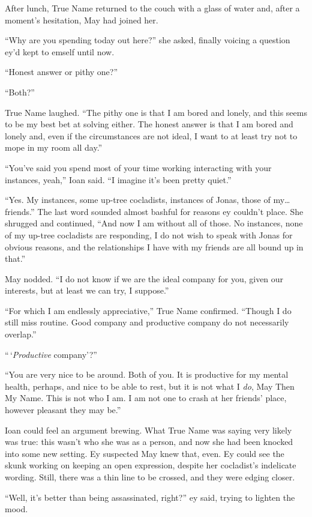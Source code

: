 After lunch, True Name returned to the couch with a glass of water and, after a moment's hesitation, May had joined her.

``Why are you spending today out here?'' she asked, finally voicing a question ey'd kept to emself until now.

``Honest answer or pithy one?''

``Both?''

True Name laughed. ``The pithy one is that I am bored and lonely, and this seems to be my best bet at solving either. The honest answer is that I am bored and lonely and, even if the circumstances are not ideal, I want to at least try not to mope in my room all day.''

``You've said you spend most of your time working interacting with your instances, yeah,'' Ioan said. ``I imagine it's been pretty quiet.''

``Yes. My instances, some up-tree cocladists, instances of Jonas, those of my\ldots friends.'' The last word sounded almost bashful for reasons ey couldn't place. She shrugged and continued, ``And now I am without all of those. No instances, none of my up-tree cocladists are responding, I do not wish to speak with Jonas for obvious reasons, and the relationships I have with my friends are all bound up in that.''

May nodded. ``I do not know if we are the ideal company for you, given our interests, but at least we can try, I suppose.''

``For which I am endlessly appreciative,'' True Name confirmed. ``Though I do still miss routine. Good company and productive company do not necessarily overlap.''

``\,`\emph{Productive} company'?''

``You are very nice to be around. Both of you. It is productive for my mental health, perhaps, and nice to be able to rest, but it is not what I \emph{do}, May Then My Name. This is not who I am. I am not one to crash at her friends' place, however pleasant they may be.''

Ioan could feel an argument brewing. What True Name was saying very likely was true: this wasn't who she was as a person, and now she had been knocked into some new setting. Ey suspected May knew that, even. Ey could see the skunk working on keeping an open expression, despite her cocladist's indelicate wording. Still, there was a thin line to be crossed, and they were edging closer.

``Well, it's better than being assassinated, right?'' ey said, trying to lighten the mood.

